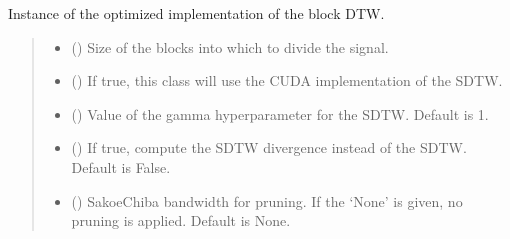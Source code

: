 \documentclass[letterpaper,10pt,english]{sphinxmanual}
\begin{document}
\begin{fulllineitems}
\begin{fulllineitems}
\label{\detokenize{dtw_loss_functions.block_dtw:dtw_loss_functions.block_dtw.block_dtw.block_dtw_optimized}}
\pysigstartsignatures
\pysigline
{}
\pysigstopsignatures
\sphinxAtStartPar
Instance of the optimized implementation of the block DTW.
\begin{quote}\begin{description}
\sphinxAtStartPar
{\hyperref[\detokenize{dtw_loss_functions.block_dtw:dtw_loss_functions.block_dtw.block_dtw_optimized}]{}}

\end{description}\end{quote}

\end{fulllineitems}

\begin{quote}\begin{description}
\begin{itemize}
\item {} 
\sphinxAtStartPar
{} () \textendash{} Size of the blocks into which to divide the signal.

\item {} 
\sphinxAtStartPar
{} () \textendash{} If true, this class will use the CUDA implementation of the SDTW.

\item {} 
\sphinxAtStartPar
{} (\sphinxstyleliteralemphasis{\sphinxupquote{, }}) \textendash{} Value of the gamma hyperparameter for the SDTW. Default is 1.

\item {} 
\sphinxAtStartPar
{} (\sphinxstyleliteralemphasis{\sphinxupquote{, }}) \textendash{} If true, compute the SDTW divergence instead of the SDTW. Default is False.

\item {} 
\sphinxAtStartPar
{} (\sphinxstyleliteralemphasis{\sphinxupquote{, }}) \textendash{} Sakoe\sphinxhyphen{}Chiba bandwidth for pruning. If the ‘None’ is given, no pruning is applied. Default is None.


\end{itemize}
\end{description}
\end{quote}
\end{fulllineitems}
\end{document}
